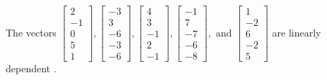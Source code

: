 \begin{exercise}
\begin{exerciseStatement}
  \end{exerciseStatement}
  \begin{exerciseAnswer}
   The vectors \(\left[\begin{array}{r}
2 \\
-1 \\
0 \\
5 \\
1
\end{array}\right] , \left[\begin{array}{r}
-3 \\
3 \\
-6 \\
-3 \\
-6
\end{array}\right] , \left[\begin{array}{r}
4 \\
3 \\
-1 \\
2 \\
-1
\end{array}\right] , \left[\begin{array}{r}
-1 \\
7 \\
-7 \\
-6 \\
-8
\end{array}\right] , \text{ and } \left[\begin{array}{r}
1 \\
-2 \\
6 \\
-2 \\
5
\end{array}\right]\) are 
  	 linearly dependent  .
  


  \end{exerciseAnswer}
\end{exercise}